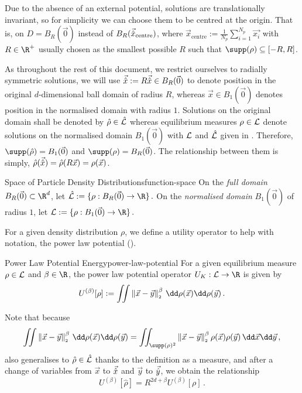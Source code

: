 Due to the absence of an external potential, solutions are translationally invariant, so for simplicity we can choose them to be centred at the origin.
That is, on $D = B_R(\vec{0})$ instead of $B_R(\vec{\hat{x}}_{\text{centre}})$, where $\vec{x}_{\text{centre}} := \frac{1}{N_p} \sum_{i=1}^{N_p} \vec{x_i}$ with $R \in \R^+$ usually chosen as the smallest possible $R$ such that $\supp(\rho) \subseteq [-R, R]$.

As throughout the rest of this document, we restrict ourselves to radially symmetric solutions, we will use $\vec{\hat{x}} := R\vec{\hat{x}} \in B_R(\vec{0})$ to denote position in the original $d$-dimensional ball domain of radius $R$, whereas $\vec{x} \in B_1(\vec{0})$ denotes position in the normalised domain with radius $1$.
Solutions on the original domain shall be denoted by $\hat{\rho} \in \hat{\mathcal{L}}$ whereas equilibrium measures $\rho \in \mathcal{L}$ denote solutions on the normalised domain $B_1(\vec{0})$ with $\mathcal{L}$ and $\hat{\mathcal{L}}$ given in .
Therefore, $\supp(\hat{\rho}) = B_1(\vec{0})$ and $\supp(\rho) = B_R(\vec{0})$.
The relationship between them is simply, $\hat{\rho}(\vec{\hat{x}}) = \hat{\rho}(R\vec{x}) = \rho(\vec{x})$.

\begin{definition}{Space of Particle Density Distributions}{function-space}
  On the \textit{full domain} $B_R(\vec{0}) \subset \R^d$, let
  $\functionspacehat := \{\rho: B_R(\vec{0}) \to \R\}\,.$
  On the \textit{normalised domain} $B_1(\vec{0})$ of radius $1$, let
  $\functionspace := \{\rho: B_1(\vec{0}) \to \R\}\,.$
\end{definition}

For a given density distribution $\rho$, we define a utility operator to help with notation, the power law potential ().

\begin{definition}{Power Law Potential Energy}{power-law-potential}
  For a given equilibrium measure $\rho \in \mathcal{L}$ and $\beta \in \R$, the power law potential operator $U_K: \functionspace \to \R$ is given by
  $$U^{(\beta)}[\rho] := \iint \norm{\vec{x}-\vec{y}}^\beta \,\dd\rho(\vec{x})\dd\rho(\vec{y})\,.$$
\end{definition}

Note that because
$$\iint \norm{\vec{x}-\vec{y}}^\beta \,\dd\rho(\vec{x})\dd\rho(\vec{y}) = \iint_{\supp(\rho)^2} \norm{\vec{x}-\vec{y}}^\beta \rho(\vec{x}) \rho(\vec{y}) \,\dd\vec{x}\dd\vec{y}\,,$$
 also generalises to $\hat{\rho} \in \hat{\mathcal{L}}$ thanks to the definition as a measure, and after a change of variables from $\vec{x}$ to $\vec{\hat{x}}$ and $\vec{y}$ to $\vec{\hat{y}}$, we obtain the relationship
$$U^{(\beta)}[\hat{\rho}] = R^{2d + \beta} U^{(\beta)}[\rho]\,.$$

